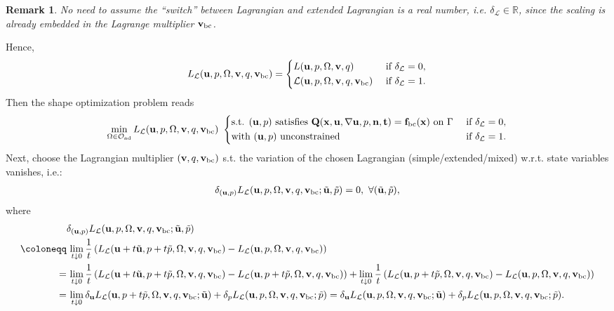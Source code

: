 \documentclass[oneside,11pt]{book}
\numberwithin{equation}{section}
\newtheorem{remark}{Remark}[section]
\begin{document}
\begin{remark}
    No need to assume the ``switch'' between Lagrangian and extended Lagrangian is a real number, i.e. $\delta_{\mathcal{L}}\in\mathbb{R}$, since the scaling is already embedded in the Lagrange multiplier ${\bf v}_{\rm bc}$.
\end{remark}
Hence,
\begin{equation*}
    L_{\mathcal{L}}({\bf u},p,\Omega,{\bf v},q,{\bf v}_{\rm bc}) = \left\{\begin{split}
        &L({\bf u},p,\Omega,{\bf v},q) &&\mbox{ if } \delta_{\mathcal{L}} = 0,\\
        &\mathcal{L}({\bf u},p,\Omega,{\bf v},q,{\bf v}_{\rm bc}) &&\mbox{ if } \delta_{\mathcal{L}} = 1.
    \end{split}\right.
\end{equation*}
Then the shape optimization problem reads
\begin{equation*}
    \min_{\Omega\in\mathcal{O}_{\rm ad}} L_{\mathcal{L}}({\bf u},p,\Omega,{\bf v},q,{\bf v}_{\rm bc})\ \left\{\begin{split}
        &\mbox{s.t. } ({\bf u},p) \mbox{ satisfies } {\bf Q}({\bf x},{\bf u},\nabla{\bf u},p,{\bf n},{\bf t}) = {\bf f}_{\rm bc}({\bf x}) \mbox{ on } \Gamma &&\mbox{ if } \delta_{\mathcal{L}} = 0,\\
        &\mbox{with } ({\bf u},p) \mbox{ unconstrained} &&\mbox{ if } \delta_{\mathcal{L}} = 1.
    \end{split}\right.
\end{equation*}
Next, choose the Lagrangian multiplier $({\bf v},q,{\bf v}_{\rm bc})$ s.t. the variation of the chosen Lagrangian (simple/extended/mixed) w.r.t. state variables vanishes, i.e.:
\begin{align*}
    \delta_{({\bf u},p)} L_{\mathcal{L}}({\bf u},p,\Omega,{\bf v},q,{\bf v}_{\rm bc};\tilde{\bf u},\tilde{p}) = 0,\ \forall(\tilde{\bf u},\tilde{p}),
\end{align*}
where
\begin{align*}
    &\delta_{({\bf u},p)} L_{\mathcal{L}}({\bf u},p,\Omega,{\bf v},q,{\bf v}_{\rm bc};\tilde{\bf u},\tilde{p})\\
    \coloneqq&\, \lim_{t\downarrow 0} \frac{1}{t}\left(L_{\mathcal{L}}({\bf u} + t\tilde{\bf u},p + t\tilde{p},\Omega,{\bf v},q,{\bf v}_{\rm bc}) - L_{\mathcal{L}}({\bf u},p,\Omega,{\bf v},q,{\bf v}_{\rm bc})\right)\\
    =&\, \lim_{t\downarrow 0} \frac{1}{t}\left(L_{\mathcal{L}}({\bf u} + t\tilde{\bf u},p + t\tilde{p},\Omega,{\bf v},q,{\bf v}_{\rm bc}) - L_{\mathcal{L}}({\bf u},p + t\tilde{p},\Omega,{\bf v},q,{\bf v}_{\rm bc})\right) + \lim_{t\downarrow 0} \frac{1}{t}\left(L_{\mathcal{L}}({\bf u},p + t\tilde{p},\Omega,{\bf v},q,{\bf v}_{\rm bc}) - L_{\mathcal{L}}({\bf u},p,\Omega,{\bf v},q,{\bf v}_{\rm bc})\right)\\
    =&\, \lim_{t\downarrow 0} \delta_{\bf u} L_{\mathcal{L}}({\bf u},p + t\tilde{p},\Omega,{\bf v},q,{\bf v}_{\rm bc};\tilde{\bf u}) + \delta_p L_{\mathcal{L}}({\bf u},p,\Omega,{\bf v},q,{\bf v}_{\rm bc};\tilde{p}) = \delta_{\bf u} L_{\mathcal{L}}({\bf u},p,\Omega,{\bf v},q,{\bf v}_{\rm bc};\tilde{\bf u}) + \delta_p L_{\mathcal{L}}({\bf u},p,\Omega,{\bf v},q,{\bf v}_{\rm bc};\tilde{p}).
\end{align*}
\end{document}
